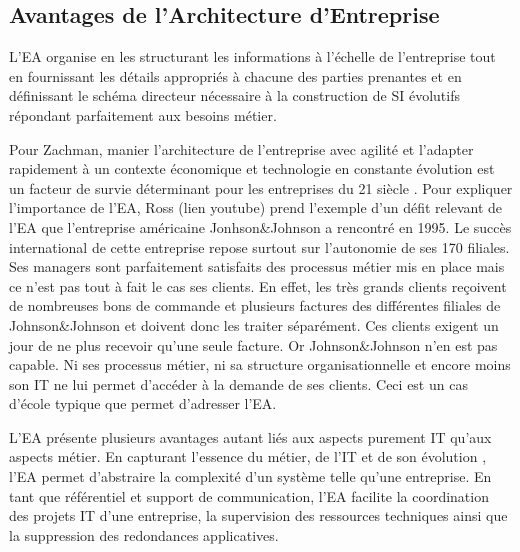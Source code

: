 


\subsection{Avantages de l'Architecture d'Entreprise}
L'EA organise en les structurant les informations à l'échelle de l'entreprise tout en fournissant les détails appropriés à chacune des parties prenantes et en définissant le schéma directeur nécessaire à la construction de SI évolutifs répondant parfaitement aux besoins métier. 


Pour Zachman, manier l'architecture de l'entreprise avec agilité et l'adapter rapidement à un contexte économique et technologie en constante évolution est un facteur de survie déterminant pour les entreprises du 21 siècle \cite{zachman1997enterprise}. Pour expliquer l'importance de l'EA, Ross (lien youtube) prend l'exemple d'un défit relevant de l'EA que l'entreprise américaine Jonhson\&Johnson a rencontré en 1995. Le succès international de cette entreprise repose surtout sur l'autonomie de ses 170 filiales. Ses managers sont parfaitement satisfaits des processus métier mis en place mais ce n'est pas tout à fait le cas ses clients. En effet, les très grands clients reçoivent de nombreuses bons de commande et plusieurs factures des différentes filiales de Johnson\&Johnson et doivent donc les traiter séparément. Ces clients exigent un jour de ne plus recevoir qu'une seule facture. Or Johnson\&Johnson n'en est pas capable. Ni ses processus métier, ni sa structure organisationnelle et encore moins son IT ne lui permet d'accéder à la demande de ses clients. Ceci est un cas d'école typique que permet d'adresser l'EA.

L'EA présente plusieurs avantages autant liés aux aspects purement IT qu'aux aspects métier. En capturant l'essence du métier, de l'IT et de son évolution \cite{lankhorst2013enterprise}, l'EA permet d'abstraire la complexité d'un système telle qu'une entreprise. En tant que référentiel et support de communication, l'EA facilite la coordination des projets IT d'une entreprise, la supervision des ressources techniques ainsi que la suppression des redondances applicatives\cite{shah2007frameworks}.

